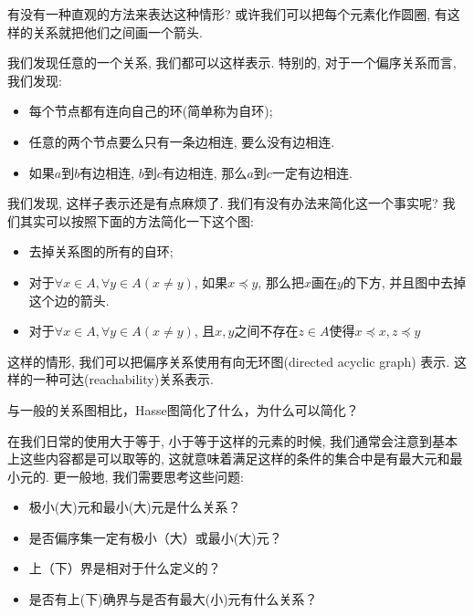\begin{bonus}
	有没有一种直观的方法来表达这种情形? 或许我们可以把每个元素化作圆圈, 有这样的关系就把他们之间画一个箭头.  
\end{bonus}

我们发现任意的一个关系, 我们都可以这样表示. 特别的, 对于一个偏序关系而言, 我们发现: 

\begin{itemize}
	\item 每个节点都有连向自己的环(简单称为自环);
	\item 任意的两个节点要么只有一条边相连, 要么没有边相连. 
	\item 如果$a$到$b$有边相连, $b$到$c$有边相连, 那么$a$到$c$一定有边相连. 
\end{itemize}

我们发现, 这样子表示还是有点麻烦了. 我们有没有办法来简化这一个事实呢? 我们其实可以按照下面的方法简化一下这个图: 

\begin{itemize}
	\item 去掉关系图的所有的自环;
	\item 对于$\forall x\in A, \forall y\in A(x\neq y)$, 如果$x\preceq y$, 那么把$x$画在$y$的下方, 并且图中去掉这个边的箭头. 
	\item 对于$\forall x\in A, \forall y \in A(x\neq y)$, 且$x,y$之间不存在$z\in A$使得$x\preceq x,z\preceq y$
\end{itemize}

这样的情形, 我们可以把偏序关系使用有向无环图(directed acyclic graph) 表示. 这样的一种可达(reachability)关系表示.

\begin{bonus}
	与一般的关系图相比，Hasse图简化了什么，为什么可以简化？
\end{bonus} 


在我们日常的使用大于等于, 小于等于这样的元素的时候, 我们通常会注意到基本上这些内容都是可以取等的, 这就意味着满足这样的条件的集合中是有最大元和最小元的. 更一般地, 我们需要思考这些问题: 

\begin{itemize}
	\item 极小(大)元和最小(大)元是什么关系？
	\item 是否偏序集一定有极小（大）或最小(大)元？
	\item 上（下）界是相对于什么定义的？
	\item 是否有上(下)确界与是否有最大(小)元有什么关系？
\end{itemize}

